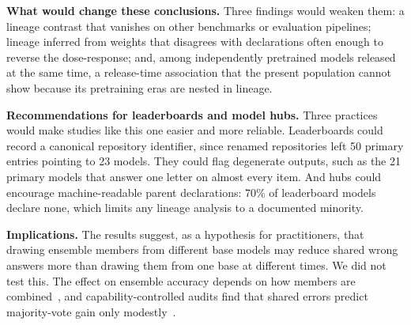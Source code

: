 \documentclass{ieeeaccess}
\theoremstyle{definition}
\theoremstyle{plain}
\begin{document}
\textbf{What would change these conclusions.} Three findings would weaken them: a lineage contrast that vanishes on other benchmarks or evaluation pipelines; lineage inferred from weights that disagrees with declarations often enough to reverse the dose-response; and, among independently pretrained models released at the same time, a release-time association that the present population cannot show because its pretraining eras are nested in lineage.

\textbf{Recommendations for leaderboards and model hubs.} Three practices would make studies like this one easier and more reliable. Leaderboards could record a canonical repository identifier, since renamed repositories left 50 primary entries pointing to 23 models. They could flag degenerate outputs, such as the 21 primary models that answer one letter on almost every item. And hubs could encourage machine-readable parent declarations: 70\% of leaderboard models declare none, which limits any lineage analysis to a documented minority.

\textbf{Implications.} The results suggest, as a hypothesis for practitioners, that drawing ensemble members from different base models may reduce shared wrong answers more than drawing them from one base at different times. We did not test this. The effect on ensemble accuracy depends on how members are combined~\cite{chen2026}, and capability-controlled audits find that shared errors predict majority-vote gain only modestly~\cite{kimd2026}.
\end{document}
